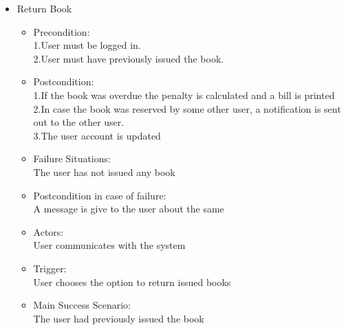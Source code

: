 \documentclass[a4paper]{article}
\begin{document}
\begin{enumerate}
\begin{itemize}
 \item Return Book\\
 \begin{itemize}
 \item Precondition:\\
 1.User must be logged in.\\
 2.User must have previously issued the book.\\
 \item Postcondition:\\
 1.If the book was overdue the penalty is calculated and a bill is printed\\ 
 2.In case the book was reserved by some other user, a notification is sent out to the other user.\\
 3.The user account is updated\\
 \item Failure Situations:\\The user has not issued any book\\
 \item Postcondition in case of failure:\\A message is give to the user about the same\\
 \item Actors:\\ User communicates with the system\\
 \item Trigger:\\ User chooses the option to return issued books\\
\item  Main Success Scenario: \\The user had previously issued the book\\
 \end{itemize}
 

\end{itemize}
\end{enumerate}
\end{document}
